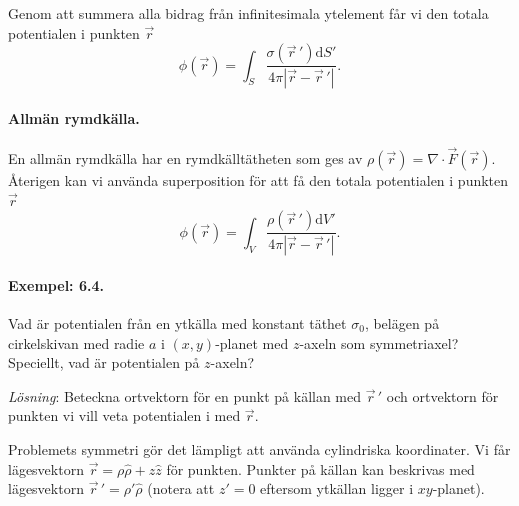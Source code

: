 \documentclass[%
oneside,                 %
final,                   %
10pt]{article}
\begin{document}
Genom att summera alla bidrag från infinitesimala ytelement får vi den totala potentialen i punkten $\vec{r}$
\begin{equation}
\phi(\vec{r}) = \int_S \frac{\sigma\left(\vec{r}\,'\right) \mbox{d}S'}{4 \pi \left| \vec{r} - \vec{r}\,' \right|}.
\end{equation}

\paragraph{Allmän rymdkälla.}
En allmän rymdkälla har en rymdkälltätheten som ges av $\rho\left( \vec{r} \right) = \nabla \cdot \vec{F} \left( \vec{r} \right)$. Återigen kan vi använda superposition för att få den totala potentialen i punkten $\vec{r}$
\begin{equation}
\phi(\vec{r}) = \int_V \frac{\rho\left(\vec{r}\,'\right) \mbox{d}V'}{4 \pi \left| \vec{r} - \vec{r}\,' \right|}.
\end{equation}

\paragraph{Exempel: 6.4.}
Vad är potentialen från en ytkälla med konstant täthet $\sigma_0$, belägen på cirkelskivan med radie $a$ i $(x,y)$-planet med $z$-axeln som symmetriaxel? Speciellt, vad är
potentialen på $z$-axeln?

\emph{Lösning}:
Beteckna ortvektorn för en punkt på källan med $\vec{r}\,'$  och ortvektorn för punkten vi vill veta potentialen i med $\vec{r}$. 

Problemets symmetri gör det lämpligt att använda cylindriska koordinater. Vi får lägesvektorn $\vec{r} = \rho \hat{\rho} + z \hat{z}$ för punkten. Punkter på källan kan beskrivas med lägesvektorn $\vec{r}\,' = \rho' \hat{\rho}$ (notera att $z'=0$ eftersom ytkällan ligger i $xy$-planet).
\end{document}
